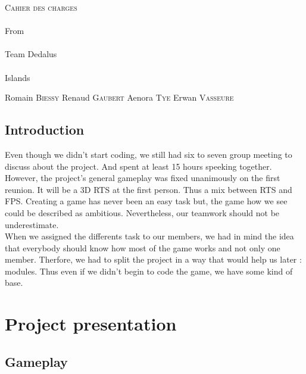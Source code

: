 \documentclass[13pt]{report}
\begin{document}
		\thispagestyle{empty}
  			\begin{titlepage} 
						\vspace*{5cm} 
  					\begin{center} 
  							{\huge{\textsc{Cahier des charges} \\ ~ \\{\large From}\\ ~\\ Team Dedalus \\ ~ \\ Islands}}
	  						\vspace*{11cm}
						\end{center}
  					\hfill {\large Romain \textsc{Biessy}}
  					\hfill {\large Renaud \textsc{Gaubert}}
  					\hfill {\large Aenora \textsc{Tye}}
  					\hfill {\large Erwan  \textsc{Vasseure}}
  			\end{titlepage} 
  	\renewcommand{\contentsname}{Sommaire}

  	\tableofcontents
  			\newpage
				\chapter{Introduction}%
								Even though we didn't start coding, we still had six to seven group meeting to discuss about the project. And spent at least 15 hours speeking together.\newline
								However, the project's general gameplay was fixed unanimously on the first reunion. It will be a 3D RTS at the first person. Thus a mix between RTS and FPS. Creating a game has never been an easy task but, the game how we see could be described as ambitious. Nevertheless, our teamwork should not be underestimate.\\
								
								When we assigned the differents task to our members, we had in mind the idea that everybody should know how most of the game works and not only one member. Therfore, we had to split the project in a way that would help us later : modules. Thus even if we didn't begin to code the game, we have some kind of base. 
								  
								
								
				\part{Project presentation}
      			\chapter{Gameplay}
\end{document}
